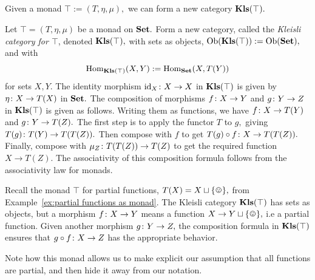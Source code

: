 \documentclass[CT4S-EN-RU]{subfiles}
\begin{document}

\subsection{}\label{sec:kleisli}

\begin{blockENG}
Given a monad $\top:=(T,\eta,\mu),$ we can form a new category ${\mathbf{Kls}}(\top).$
\end{blockENG}

\begin{blockRUS}
\end{blockRUS}

\begin{definitionENG}\label{def:kleisli}
Let $\top=(T,\eta,\mu)$ be a monad on ${\mathbf{Set}}.$ Form a new category, called the {\em Kleisli category for $\top$}, denoted ${\mathbf{Kls}}(\top),$ with sets as objects, $\textnormal{Ob}({\mathbf{Kls}}(\top)):=\textnormal{Ob}({\mathbf{Set}}),$ and with $$\textnormal{Hom}_{{\mathbf{Kls}}(\top)}(X,Y):=\textnormal{Hom}_{\mathbf{Set}}(X,T(Y))$$ for sets $X,Y.$ The identity morphism $\textnormal{id}_X\colon X\rightarrow X$ in ${\mathbf{Kls}}(\top)$ is given by $\eta\colon X\rightarrow T(X)$ in ${\mathbf{Set}}.$ The composition of morphisms $f\colon X\rightarrow Y$ and $g\colon Y\rightarrow Z$ in ${\mathbf{Kls}}(\top)$ is given as follows. Writing them as functions, we have $f\colon X\rightarrow T(Y)$ and $g\colon Y\rightarrow T(Z).$ The first step is to apply the functor $T$ to $g,$ giving $T(g)\colon T(Y)\rightarrow T(T(Z)).$ Then compose with $f$ to get $T(g)\circ f\colon X\rightarrow T(T(Z)).$ Finally, compose with $\mu_Z\colon T(T(Z))\rightarrow T(Z)$ to get the required function $X\to T(Z).$ The associativity of this composition formula follows from the associativity law for monads.
\end{definitionENG}

\begin{definitionRUS}\label{def:kleisli}
\end{definitionRUS}

\begin{exampleENG}
Recall the monad $\top$ for partial functions, $T(X)=X\sqcup\singleton,$ from Example~\ref{ex:partial functions as monad}. The Kleisli category ${\mathbf{Kls}}(\top)$ has sets as objects, but a morphism $f\colon X\rightarrow Y$ means a function $X\to Y\sqcup\singleton,$ i.e a partial function. Given another morphism $g\colon Y\rightarrow Z,$ the composition formula in ${\mathbf{Kls}}(\top)$ ensures that $g\circ f\colon X\rightarrow Z$ has the appropriate behavior.

Note how this monad allows us to make explicit our assumption that all functions are partial, and then hide it away from our notation.
\end{exampleENG}
\end{document}
